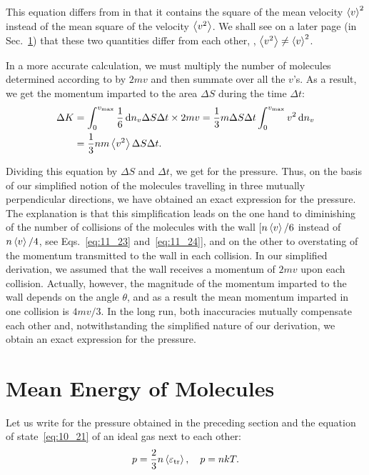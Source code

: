 \noindent
This equation differs from  in that it contains the square of the mean velocity $\left\langle v \right\rangle^2$ instead of the mean square of the velocity $\left\langle v^2 \right\rangle$. We shall see on a later page (in Sec.~\ref{sec:11_5}) that these two quantities differ from each other, \ie, $\left\langle v^2 \right\rangle\neq\left\langle v \right\rangle^2$.

In a more accurate calculation, we must multiply the number of molecules determined according to  by $2mv$ and then summate over all the $v$'s. As a result, we get the momentum imparted to the area $\Delta S$ during the time $\Delta t$:
\begin{align*}
	\Delta K &= \int_{0}^{v_{\text{max}}} \frac{1}{6}\,\mathrm{d} n_v\Delta S\Delta t \times 2mv = \frac{1}{3}m \Delta S\Delta t \int_{0}^{v_{\text{max}}} v^2\,\mathrm{d} n_v\\
	&= \frac{1}{3}nm\left\langle v^2 \right\rangle \Delta S\Delta t.
\end{align*}

\noindent
Dividing this equation by $\Delta S$ and $\Delta t$, we get  for the pressure. Thus, on the basis of our simplified notion of the molecules travelling in three mutually perpendicular directions, we have obtained an exact expression for the pressure. The explanation is that this simplification leads on the one hand to diminishing of the number of collisions of the molecules with the wall [$n\left\langle v \right\rangle/6$ instead of $n\left\langle v \right\rangle/4$, see Eqs.~\eqref{eq:11_23} and~\eqref{eq:11_24}], and on the other to overstating of the momentum transmitted to the wall in each collision. In our simplified derivation, we assumed that the wall receives a momentum of $2mv$ upon each collision. Actually, however, the magnitude of the momentum imparted to the wall depends on the angle $\theta$, and as a result the mean momentum imparted in one collision is $4mv/3$. In the long run, both inaccuracies mutually compensate each other and, notwithstanding the simplified nature of our derivation, we obtain an exact expression for the pressure.

\section{Mean Energy of Molecules}\label{sec:11_5}

Let us write  for the pressure obtained in the preceding section and the equation of state~\eqref{eq:10_21} of an ideal gas next to each other:
\begin{equation*}
	p = \frac{2}{3}n\left\langle \varepsilon_{\text{tr}} \right\rangle,\quad p = nkT.
\end{equation*}


